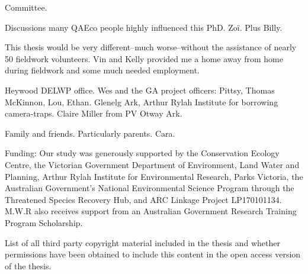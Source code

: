 \documentclass[11pt,a4paper,titlepage,twoside,openright]{style/unimelbthesis}
\begin{document}
\begin{frontmatter}
\begin{acknowledgements}
    Committee.
    
    Discussions many QAEco people highly influenced this PhD. Zoï. Plus Billy.
    
    This thesis would be very different--much worse--without the assistance of nearly 50 fieldwork volunteers.
    Vin and Kelly provided me a home away from home during fieldwork and some much needed employment.
    
    Heywood DELWP office. Wes and the GA project officers: Pittsy, Thomas McKinnon, Lou, Ethan.
    Glenelg Ark, Arthur Rylah Institute for borrowing camera-traps.
    Claire Miller from PV Otway Ark.
    
    Family and friends. Particularly parents. Cara.
    
    Funding:
    Our study was generously supported by the Conservation Ecology Centre, the Victorian Government Department of Environment, Land Water and Planning, Arthur Rylah Institute for Environmental Research, Parks Victoria, the Australian Government's National Environmental Science Program through the Threatened Species Recovery Hub, and ARC Linkage Project LP170101134. M.W.R also receives support from an Australian Government Research Training Program Scholarship.
  \end{acknowledgements}

  \hypersetup{linkcolor=black}
  \setcounter{tocdepth}{2}
  \tableofcontents


  \listoftables


  \listoffigures

\begin{copyrightlist}
  List of all third party copyright material included in the thesis and whether
  permissions have been obtained to include this content in the open access
  version of the thesis.
\end{copyrightlist}
\end{frontmatter}
%
\end{document}

